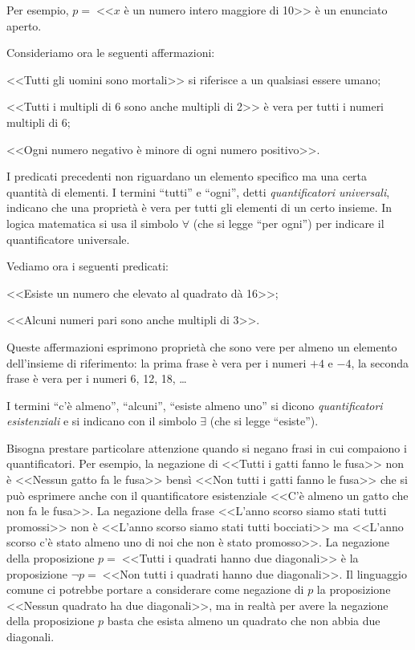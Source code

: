 Per esempio, $p =\;$<<$x$ è un numero intero maggiore di 10>> è un enunciato aperto.

Consideriamo ora le seguenti affermazioni:
\begin{itemize*}
\item <<Tutti gli uomini sono mortali>> si riferisce a un qualsiasi essere umano;
\item <<Tutti i multipli di 6 sono anche multipli di 2>> è vera per tutti i numeri multipli di 6;
\item <<Ogni numero negativo è minore di ogni numero positivo>>.
\end{itemize*}
I predicati precedenti non riguardano un elemento specifico ma una certa quantità di elementi. I termini ``tutti'' e ``ogni'', detti \emph{quantificatori universali}, indicano che una proprietà è vera per tutti gli elementi di un certo insieme. In logica matematica si usa il simbolo $\forall$ (che si legge ``per ogni'') per indicare il quantificatore universale.

Vediamo ora i seguenti predicati:
\begin{itemize*}
\item <<Esiste un numero che elevato al quadrato dà 16>>;
\item <<Alcuni numeri pari sono anche multipli di 3>>.
\end{itemize*}
Queste affermazioni esprimono proprietà che sono vere per almeno un elemento dell'insieme di riferimento: la prima frase è vera per i numeri $+4$ e $-4$, la seconda frase è vera per i numeri 6, 12, 18, \ldots{}

I termini ``c'è almeno'', ``alcuni'', ``esiste almeno uno'' si dicono \emph{quantificatori esistenziali} e si indicano con il simbolo $\exists$ (che si legge ``esiste'').

Bisogna prestare particolare attenzione quando si negano frasi in cui compaiono i quantificatori. Per esempio, la negazione di <<Tutti i gatti fanno le fusa>> non è <<Nessun gatto fa le fusa>> bensì <<Non tutti i gatti fanno le fusa>> che si può esprimere anche con il quantificatore esistenziale <<C'è almeno un gatto che non fa le fusa>>.
La negazione della frase <<L'anno scorso siamo stati tutti promossi>> non è <<L'anno scorso siamo stati tutti bocciati>> ma <<L'anno scorso c'è stato almeno uno di noi che non è stato promosso>>.
La negazione della proposizione $p =\;$<<Tutti i quadrati hanno due diagonali>> è la proposizione $\neg p =\;$<<Non tutti i quadrati hanno due diagonali>>. Il linguaggio comune ci potrebbe portare a considerare come negazione di $p$ la proposizione <<Nessun quadrato ha due diagonali>>, ma in realtà per avere la negazione della proposizione $p$ basta che esista almeno un quadrato che non abbia due diagonali.

